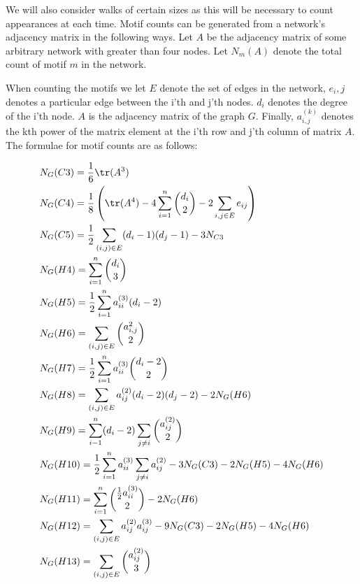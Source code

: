 
\FloatBarrier

\vspace{3mm} 

We will also consider walks of certain sizes as this will be necessary to count appearances at each time. Motif counts can be generated from a network's adjacency matrix in the following ways. Let $A$
be the adjacency matrix of some arbitrary network with greater than four nodes. Let $N_m(A)$ denote 
the total count of motif $m$ in the network. 

\vspace{3mm}

When counting the motifs we let $E$ denote the set of edges in the network, $e_i,j$ denotes a particular edge between the 
i'th and j'th nodes. $d_i$ denotes the degree of the i'th node. $A$ is the adjacency matrix of the
 graph $G$. Finally, $a^{(k)}_{i,j}$ denotes the kth power of the matrix 
element at the i'th row and j'th column of matrix $A$. The formulae for motif counts are as follows:

\newpage

\begin{align*}
    &N_G(C3) = \frac{1}{6} \tr({A^3}) \\
    &N_G(C4) = \frac{1}{8} \left(\tr(A^4) -4\sum^{n}_{i=1} {d_i \choose 2} - 2\sum_{i,j \in E} e_{ij} \right)\\
    &N_G(C5) = \frac{1}{2}\sum_{(i,j)\in E} (d_i - 1)(d_j - 1) - 3 N_{C3} \\
    &N_G(H4) = \sum^{n}_{i=1} {d_i \choose 3} \\
    &N_G(H5) = \frac{1}{2} \sum^{n}_{i=1} a^{(3)}_{ii} (d_i-2)\\
    &N_G(H6)= \sum_{(i,j)\in E}{a^{2}_{i,j} \choose 2 }\\
    &N_G(H7) = \frac{1}{2} \sum^{n}_{i=1} a^{(3)}_{ii} {{d_i-2} \choose 2}\\
    &N_G(H8)= \sum_{(i,j)\in E} a^{(2)}_{ij} (d_i-2)(d_j-2) - 2 N_G(H6)\\
    &N_G(H9) = \sum^{n}_{i-1}(d_i-2) \sum_{j \neq i} {a^{(2)}_{ij} \choose 2 }\\
    &N_G(H10) = \frac{1}{2}\sum^{n}_{i=1}a^{(3)}_{ii} \sum_{j \neq i} a^{(2)}_{ij} - 3 N_G(C3)- 2N_G(H5) -4N_G(H6)\\
    &N_G(H11) = \sum^{n}_{i=1} {\frac{1}{2}a^{(3)}_{ii} \choose 2} - 2N_G(H6)\\
    &N_G(H12) = \sum_{(i,j)\in E} a^{(2)}_{ij} a^{(3)}_{ij} - 9N_G(C3) -2N_G(H5)-4N_G(H6)\\
    &N_G(H13) = \sum_{(i,j)\in E} {a^{(2)}_{ij} \choose 3}\\
\end{align*}

